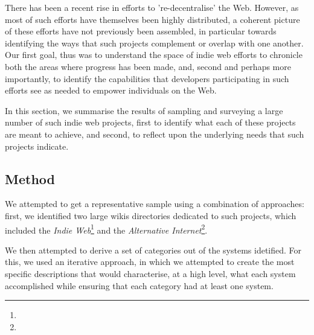 \documentclass{amsart}
\begin{document}



There has been a recent rise in efforts to 're-decentralise' the Web. However, as most of such efforts have themselves been highly distributed, a coherent picture of these efforts have not previously been assembled, in particular towards identifying the ways that such projects complement or overlap with one another. Our first goal, thus was to understand the space of indie web efforts to chronicle both the areas where progress has been made, and, second and perhaps more importantly, to identify the capabilities that developers participating in such efforts see as needed to empower individuals on the Web. 

In this section, we summarise the results of sampling and surveying a large number of such indie web projects, first to identify what each of these projects are meant to achieve, and second, to reflect upon the underlying needs that such projects indicate.

\subsection{Method}
We attempted to get a representative sample using a combination of approaches: first, we identified two large wikis directories dedicated to such projects, which included the \emph{Indie Web}\footnote{} and the \emph{Alternative Internet}\footnote{}. 

We then attempted to derive a set of categories out of the systems idetified.  For this, we used an iterative approach, in which we attempted to create the most specific descriptions that would characterise, at a high level, what each system accomplished while ensuring that each category had at least one system.
\end{document}
